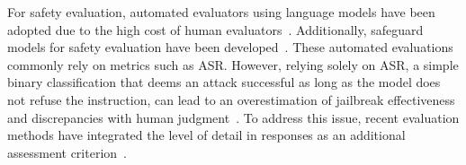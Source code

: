 For safety evaluation, automated evaluators using language models have been adopted due to the high cost of human evaluators~\cite{vlguard2024, jailbreak28k2024, mmsafetybench2025, spavl2024, rtvlm2024}. Additionally, safeguard models for safety evaluation have been developed~\cite{inan2023llamaguard, chi2024llamaguardvision, mllmguard2024}. These automated evaluations commonly rely on metrics such as ASR. However, relying solely on ASR, a simple binary classification that deems an attack successful as long as the model does not refuse the instruction, can lead to an overestimation of jailbreak effectiveness and discrepancies with human judgment~\cite{strongreject2024}. To address this issue, recent evaluation methods have integrated the level of detail in responses as an additional assessment criterion~\cite{strongreject2024, o12024, guan2024deliberative}.